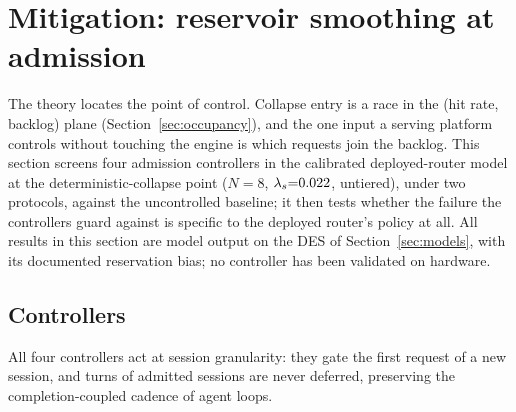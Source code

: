 \section{Mitigation: reservoir smoothing at admission}
\label{sec:mitigation}

The theory locates the point of control. Collapse entry is a race in
the (hit rate, backlog) plane (Section~\ref{sec:occupancy}), and the one input a
serving platform controls without touching the engine is which
requests join the backlog. This section screens four admission
controllers in the calibrated deployed-router model at the
deterministic-collapse point ($N{=}8$, $\lambda_s{=}0.022$, untiered), under
two protocols, against the uncontrolled baseline; it then tests
whether the failure the controllers guard against is specific to the
deployed router's policy at all. All results in this section are
model output on the DES of Section~\ref{sec:models}, with its documented
reservation bias; no controller has been validated on hardware.

\subsection{Controllers}
\label{sec:controllers}

All four controllers act at session granularity: they gate the first
request of a new session, and turns of admitted sessions are never
deferred, preserving the completion-coupled cadence of agent loops.

